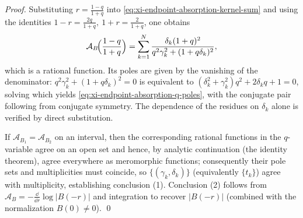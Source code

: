 \begin{proof}
Substituting \(r=\frac{1-q}{1+q}\) into \eqref{eq:xi-endpoint-absorption-kernel-sum} and using the identities
\(
1-r=\frac{2q}{1+q},\ 1+r=\frac{2}{1+q}
\),
one obtains
\[
\mathcal{A}_B\!\Bigl(\frac{1-q}{1+q}\Bigr)
=\sum_{k=1}^{N}
\frac{\delta_k(1+q)^2}{q^2\gamma_k^2+(1+q\delta_k)^2},
\]
which is a rational function. Its poles are given by the vanishing of the denominator:
\(
q^2\gamma_k^2+(1+q\delta_k)^2=0
\)
is equivalent to
\(
(\delta_k^2+\gamma_k^2)q^2+2\delta_k q+1=0
\),
solving which yields \eqref{eq:xi-endpoint-absorption-q-poles}, with the conjugate pair following from conjugate symmetry.
The dependence of the residues on \(\delta_k\) alone is verified by direct substitution.
\par
If \(\mathcal{A}_{B_1}=\mathcal{A}_{B_2}\) on an interval, then the corresponding rational functions in the \(q\)-variable agree on an open set and hence, by analytic continuation (the identity theorem), agree everywhere as meromorphic functions; consequently their pole sets and multiplicities must coincide, so \(\{(\gamma_k,\delta_k)\}\) (equivalently \(\{t_k\}\)) agree with multiplicity, establishing conclusion (1).
Conclusion (2) follows from \(\mathcal{A}_B=-\frac{\dd}{\dd r}\log|B(-r)|\) and integration to recover \(|B(-r)|\) (combined with the normalization \(B(0)\neq 0\)). \qed
\end{proof}

